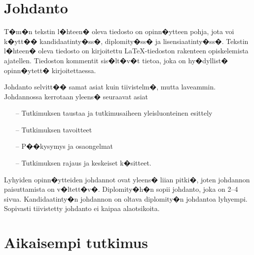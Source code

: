 \documentclass[finnish,12pt,a4paper,pdftex]{article}
\begin{document}
\section{Johdanto}

\thispagestyle{empty}

T�m�n tekstin l�hteen� oleva tiedosto on opinn�ytteen
pohja, jota voi k�ytt�� kandidaatinty�ss�, diplomity�ss� ja
lisensiaatinty�ss�. Tekstin 
l�hteen� oleva tiedosto on kirjoitettu  \LaTeX-tiedoston rakenteen
opiskelemista ajatellen. Tiedoston kommentit sis�lt�v�t
tietoa, joka on hy�dyllist� opinn�ytett� kirjoitettaessa. 

Johdanto selvitt�� samat asiat kuin tiivistelm�, mutta
laveammin. Johdannossa kerrotaan yleens� seuraavat asiat

\begin{itemize}
\item[--]Tutkimuksen taustaa ja tutkimusaiheen yleisluonteinen esittely
\item[--]Tutkimuksen tavoitteet
\item[--]P��kysymys ja osaongelmat
\item[--]Tutkimuksen rajaus ja keskeiset k�sitteet.
\end{itemize}

Lyhyiden opinn�ytteiden johdannot ovat yleens� liian pitki�, joten
johdannon paisuttamista on v�ltett�v�. Diplomity�h�n sopii johdanto,
joka on 2--4 sivua. %
Kandidaatinty�n johdannon on oltava diplomity�n
johdantoa lyhyempi. Sopivasti tiivistetty johdanto ei kaipaa alaotsikoita.


\clearpage

\section{Aikaisempi tutkimus}
\end{document}
